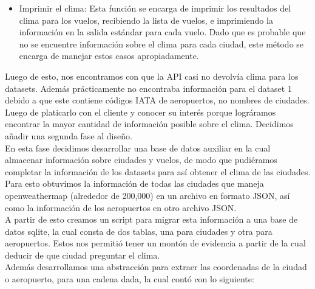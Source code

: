 \documentclass{report}
\begin{document}
\begin{itemize}
\begin{itemize}
        \item Imprimir el clima: Esta función se encarga de imprimir los resultados del clima para los vuelos, recibiendo la lista de vuelos, e imprimiendo la información en la salida estándar para cada vuelo. Dado que es probable que no se encuentre información sobre el clima para cada ciudad, este método se encarga de manejar estos casos apropiadamente.
    \end{itemize}
\end{itemize}
Luego de esto, nos encontramos con que la API casi no devolvía clima para los datasets. Además prácticamente no encontraba información para el dataset 1 debido a que este contiene códigos IATA de aeropuertos, no nombres de ciudades. Luego de platicarlo con el cliente y conocer su interés porque lográramos encontrar la mayor cantidad de información posible sobre el clima. Decidimos añadir una segunda fase al diseño. \\
En esta fase decidimos desarrollar una base de datos auxiliar en la cual almacenar información sobre ciudades y vuelos, de modo que pudiéramos completar la información de los datasets para así obtener el clima de las ciudades. Para esto obtuvimos la información de todas las ciudades que maneja openweathermap (alrededor de 200,000) en un archivo en formato JSON, así como la información de los aeropuertos en otro archivo JSON. \\
A partir de esto creamos un script para migrar esta información a una base de datos sqlite, la cual consta de dos tablas, una para ciudades y otra para aeropuertos. Estos nos permitió tener un montón de evidencia a partir de la cual deducir de que ciudad preguntar el clima. \\
Además desarrollamos una abstracción para extraer las coordenadas de la ciudad o aeropuerto, para una cadena dada, la cual contó con lo siguiente:
\end{document}
